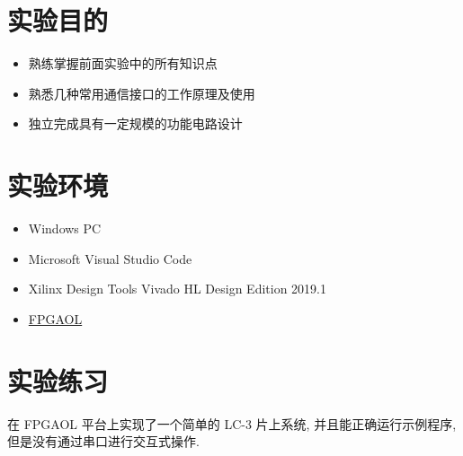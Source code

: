 \documentclass[UTF8,fontset=fandol]{ctexart}
\begin{document}
\section*{实验目的}
\begin{itemize}
  \item 熟练掌握前面实验中的所有知识点
  \item 熟悉几种常用通信接口的工作原理及使用
  \item 独立完成具有一定规模的功能电路设计
\end{itemize}
\section*{实验环境}
\begin{itemize}
  \item Windows PC
  \item Microsoft Visual Studio Code
  \item Xilinx Design Tools Vivado HL Design Edition 2019.1 
  \item \href{http://fpgaol.ustc.edu.cn}{FPGAOL}
\end{itemize}
\section*{实验练习}
在 FPGAOL 平台上实现了一个简单的 LC-3 片上系统, 并且能正确运行示例程序, 但是没有通过串口进行交互式操作.
\end{document}
